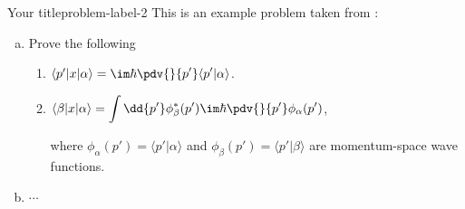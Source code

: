 \begin{problem}{Your title}{problem-label-2}
	This is an example problem taken from \cite{Sakurai2020}:
	
	\begin{enumerate}[(a)]
		\item Prove the following
		\begin{enumerate}[label = (\roman*)]
			\item $\langle p' | x | \alpha \rangle = \im \hbar \displaystyle{\pdv{}{p'} }\langle p' | \alpha \rangle$.
			
			\item $\langle \beta | x | \alpha \rangle = \displaystyle{\int \dd{p'} \phi_{\beta}^{*} (p') \im \hbar \pdv{}{p'} \phi_{\alpha} (p')}$, 
			
			\vspace{1ex}
			
			where $\phi_{\alpha}(p') = \langle p' | \alpha \rangle$ and $\phi_{\beta}(p') = \langle p' | \beta \rangle$ are momentum-space wave functions.
		\end{enumerate}
		
		\item $\cdots$
	\end{enumerate}
\end{problem}


